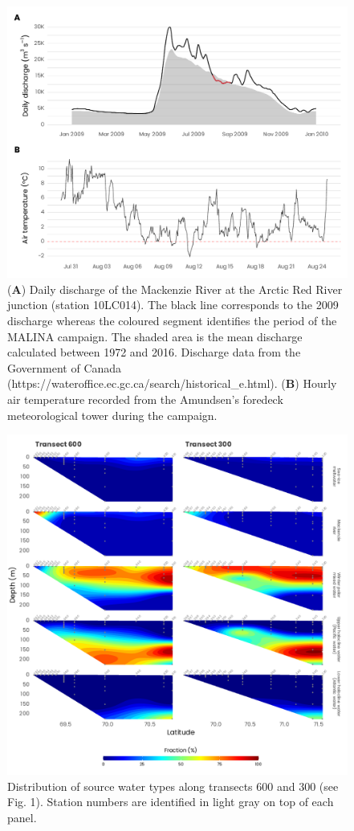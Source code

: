 \documentclass[essd, manuscript]{copernicus}
\begin{document}
\begin{figure}[H]
    \centering
    \includegraphics[scale = 1]{../../../graphs/fig02.pdf}
    \caption{(\textbf{A}) Daily discharge of the Mackenzie River at the Arctic Red River junction (station 10LC014). The black line corresponds to the 2009 discharge whereas the coloured segment identifies the period of the MALINA campaign. The shaded area is the mean discharge calculated between 1972 and 2016. Discharge data from the Government of Canada (https://wateroffice.ec.gc.ca/search/historical\_e.html). (\textbf{B}) Hourly air temperature recorded from the Amundsen's foredeck meteorological tower during the campaign.}
\end{figure}

\clearpage

\begin{figure}[H]
    \centering
    \includegraphics[scale = 1]{../../../graphs/fig03.pdf}
    \caption{Distribution of source water types along transects 600 and 300 (see Fig. 1). Station numbers are identified in light gray on top of each panel.}
\end{figure}
\end{document}
